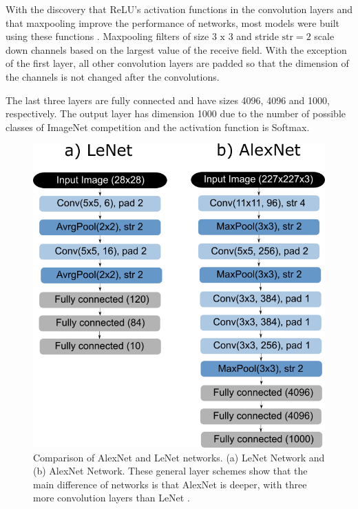 With the discovery that ReLU's activation functions in the convolution layers and that maxpooling improve the performance of networks, most models were built using these functions \cite{zhang2020dive}. Maxpooling filters of size $3\text{ x }3$ and stride $\text{str} = 2$ scale down channels based on the largest value of the receive field. With the exception of the first layer, all other convolution layers are padded so that the dimension of the channels is not changed after the convolutions.

The last three layers are fully connected and have sizes 4096, 4096 and 1000, respectively. The output layer has dimension 1000 due to the number of possible classes of ImageNet competition and the activation function is Softmax.

\begin{figure}
    \centering
    \includegraphics[scale=0.4]{Part 3 - Learning Systems/Supervised Learning/Deep Learning/images/figure129.png}
    \caption{ Comparison of AlexNet and LeNet networks. (a) LeNet Network and (b)  AlexNet Network. These general layer schemes show that the main difference of networks is that AlexNet is deeper, with three more convolution layers than LeNet \cite{zhang2020dive}.}
    \label{fig:lenetalexnet}
\end{figure}

